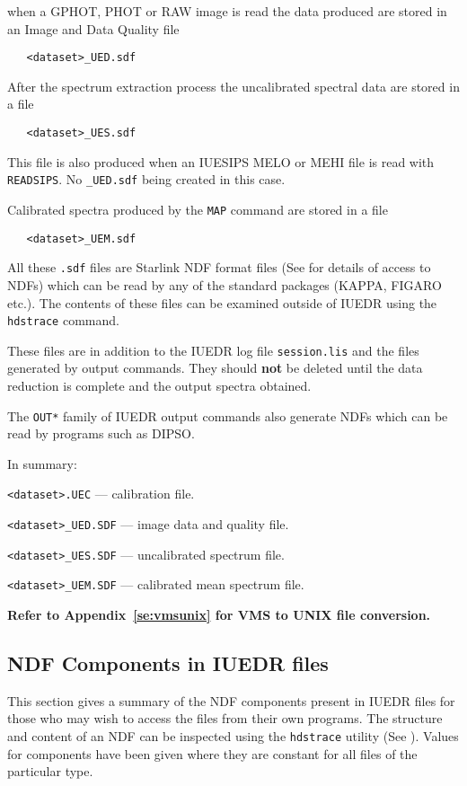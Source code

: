 when a GPHOT, PHOT or RAW image is read the data produced are stored in an
Image and Data Quality file
\begin{verbatim}
   <dataset>_UED.sdf
\end{verbatim}
After the spectrum extraction process the uncalibrated spectral data are stored
in a file
\begin{verbatim}
   <dataset>_UES.sdf
\end{verbatim}
This file is also produced when an IUESIPS MELO or MEHI file is read with
\verb+READSIPS+\@.  No \verb+_UED.sdf+ being created in this case.

Calibrated spectra produced by the \verb+MAP+ command are stored in a file
\begin{verbatim}
   <dataset>_UEM.sdf
\end{verbatim}

All these \verb+.sdf+ files are Starlink NDF format files (See
for details of access to NDFs) which can be read by any of the standard
packages (KAPPA, FIGARO etc.).  The contents of these files can be examined
outside of IUEDR using the \verb+hdstrace+ command.

These files are in addition to the IUEDR log file \verb+session.lis+ and the
files generated by output commands.  They should {\bf not} be deleted until the
data reduction is complete and the output spectra obtained.

The \verb+OUT*+ family of IUEDR output commands also generate NDFs which can
be read by programs such as DIPSO.

In summary:
\begin {description}
   \item \verb+<dataset>.UEC+ --- calibration file.
   \item \verb+<dataset>_UED.SDF+ --- image data and quality file.
   \item \verb+<dataset>_UES.SDF+ --- uncalibrated spectrum file.
   \item \verb+<dataset>_UEM.SDF+ --- calibrated mean spectrum file.
\end {description}

{\bf Refer to Appendix~\ref{se:vmsunix} for VMS to UNIX file conversion.}

\subsection{\label{subap:ndf}NDF Components in IUEDR files}

This section gives a summary of the NDF components present in IUEDR files for
those who may wish to access the files from their own programs.
The structure and content of an NDF can be inspected using the {\tt hdstrace}
utility (See )\@.  Values for components have been
given where they are constant for all files of the particular type.

